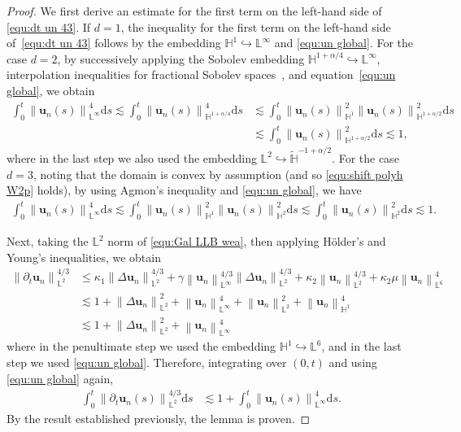 \documentclass[11pt,reqno]{amsart}
\theoremstyle{definition}
\numberwithin{equation}{section}
\newcommand{\bff}{\boldsymbol}
\newcommand{\bb}{\mathbb}
\newcommand{\leqs}{\lesssim}
\newcommand{\ds}{\mathrm{d}s}
\newcommand{\pa}{\partial}
\newcommand{\norm}[2]{\left\|{#1}\right\|_{#2}}
\begin{document}
\begin{proof}
We first derive an estimate for the first term on the left-hand side of \eqref{equ:dt un 43}. If $d=1$, the inequality for the first term on the left-hand side of~\eqref{equ:dt un 43} follows by the embedding $\bb{H}^1 \hookrightarrow \bb{L}^\infty$ and \eqref{equ:un global}.
For the case $d=2$, by successively applying the Sobolev embedding $\bb{H}^{1+ \alpha/4} \hookrightarrow \bb{L}^\infty$, interpolation inequalities for fractional Sobolev spaces~\citep{BreMir18}, and equation~\eqref{equ:un global}, we obtain
\begin{align*}
	\int_0^t \norm{\bff{u}_n(s)}{\bb{L}^\infty}^4 \ds
	\lesssim
	\int_0^t \norm{\bff{u}_n(s)}{\bb{H}^{1+\alpha/4}}^4 \ds
	&\lesssim
	\int_0^t \norm{\bff{u}_n(s)}{\bb{H}^1}^2 \norm{\bff{u}_n(s)}{\bb{H}^{1+\alpha/2}}^2 \ds
	\\
	&\lesssim
	\int_0^t \norm{\bff{u}_n(s)}{\bb{H}^{1+\alpha/2}}^2 \ds
	\lesssim 1,
\end{align*}
where in the last step we also used the embedding $\bb{L}^2\hookrightarrow \widetilde{\bb{H}}^{-1+\alpha/2}$.
For the case $d=3$, noting that the domain is convex by assumption (and so \eqref{equ:shift polyh W2p} holds), by using Agmon's inequality and \eqref{equ:un global}, we have
\begin{align*}%
	\int_0^t \norm{\bff{u}_n(s)}{\bb{L}^\infty}^4 \ds
	\lesssim
	\int_0^t \norm{\bff{u}_n(s)}{\bb{H}^1}^2 \norm{\bff{u}_n(s)}{\bb{H}^2}^2 \ds
	\lesssim
	\int_0^t \norm{\bff{u}_n(s)}{\bb{H}^2}^2 \ds
	\lesssim 1.
\end{align*}

Next, taking the $\bb{L}^2$ norm of \eqref{equ:Gal LLB wea}, then applying H\"older's and Young's inequalities, we obtain
\begin{align*}
	\norm{\pa_t \bff{u}_n}{\bb{L}^2}^{4/3}
	&\leq
	\kappa_1 \norm{\Delta \bff{u}_n}{\bb{L}^2}^{4/3}
	+
	\gamma \norm{\bff{u}_n}{\bb{L}^\infty}^{4/3} \norm{\Delta \bff{u}_n}{\bb{L}^2}^{4/3}
	+
	\kappa_2 \norm{\bff{u}_n}{\bb{L}^2}^{4/3}
	+
	\kappa_2 \mu \norm{\bff{u}_n}{\bb{L}^6}^4
	\\
	&\leqs
	1+ \norm{\Delta \bff{u}_n}{\bb{L}^2}^2 + \norm{\bff{u}_n}{\bb{L}^\infty}^4
	+ \norm{\bff{u}_n}{\bb{L}^2}^2 + \norm{\bff{u}_n}{\bb{H}^1}^4
	\\
	&\leqs
	1+ \norm{\Delta \bff{u}_n}{\bb{L}^2}^2 + \norm{\bff{u}_n}{\bb{L}^\infty}^4
\end{align*}
where in the penultimate step we used the embedding $\bb{H}^1\hookrightarrow \bb{L}^6$, and in the last step we used \eqref{equ:un global}. Therefore, integrating over $(0,t)$ and using \eqref{equ:un global} again,
\begin{align*}
	\int_0^t \norm{\pa_t \bff{u}_n(s)}{\bb{L}^2}^{4/3} \ds
	&\leqs
	1+ \int_0^t \norm{\bff{u}_n(s)}{\bb{L}^\infty}^4 \ds.
\end{align*}
By the result established previously, the lemma is proven.
\end{proof}
\end{document}
